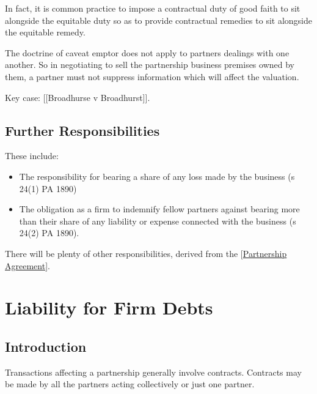 \documentclass[
]{article}
\newenvironment{Shaded}{}{}
\newcommand{\NormalTok}[1]{#1}
\providecommand{\tightlist}{%
  \setlength{\itemsep}{0pt}\setlength{\parskip}{0pt}}
\begin{document}
In fact, it is common practice to impose a contractual duty of good
faith to sit alongside the equitable duty so as to provide contractual
remedies to sit alongside the equitable remedy.

\begin{Shaded}
\begin{Highlighting}[]
\NormalTok{The doctrine of caveat emptor does not apply to partners\textquotesingle{} dealings with one another. So in negotiating to sell the partnership business premises owned by them, a partner must not suppress information which will affect the valuation.}
\end{Highlighting}
\end{Shaded}

Key case: {[}{[}Broadhurse v Broadhurst{]}{]}.

\hypertarget{further-responsibilities}{%
\subsection{Further Responsibilities}\label{further-responsibilities}}

These include:

\begin{itemize}
\tightlist
\item
  The responsibility for bearing a share of any loss made by the
  business (s 24(1) PA 1890)
\item
  The obligation as a firm to indemnify fellow partners against bearing
  more than their share of any liability or expense connected with the
  business (s 24(2) PA 1890).
\end{itemize}

There will be plenty of other responsibilities, derived from the
{[}\protect\hyperlink{partnership-agreement}{Partnership Agreement}{]}.

\hypertarget{liability-for-firm-debts}{%
\section{Liability for Firm Debts}\label{liability-for-firm-debts}}

\hypertarget{introduction-3}{%
\subsection{Introduction}\label{introduction-3}}

Transactions affecting a partnership generally involve contracts.
Contracts may be made by all the partners acting collectively or just
one partner.
\end{document}
